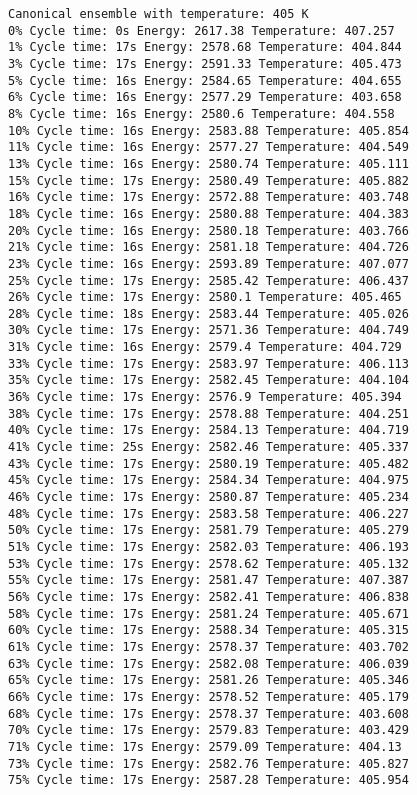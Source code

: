 \documentclass{article}
\begin{document}
\begin{verbatim}
Canonical ensemble with temperature: 405 K
0% Cycle time: 0s Energy: 2617.38 Temperature: 407.257
1% Cycle time: 17s Energy: 2578.68 Temperature: 404.844
3% Cycle time: 17s Energy: 2591.33 Temperature: 405.473
5% Cycle time: 16s Energy: 2584.65 Temperature: 404.655
6% Cycle time: 16s Energy: 2577.29 Temperature: 403.658
8% Cycle time: 16s Energy: 2580.6 Temperature: 404.558
10% Cycle time: 16s Energy: 2583.88 Temperature: 405.854
11% Cycle time: 16s Energy: 2577.27 Temperature: 404.549
13% Cycle time: 16s Energy: 2580.74 Temperature: 405.111
15% Cycle time: 17s Energy: 2580.49 Temperature: 405.882
16% Cycle time: 17s Energy: 2572.88 Temperature: 403.748
18% Cycle time: 16s Energy: 2580.88 Temperature: 404.383
20% Cycle time: 16s Energy: 2580.18 Temperature: 403.766
21% Cycle time: 16s Energy: 2581.18 Temperature: 404.726
23% Cycle time: 16s Energy: 2593.89 Temperature: 407.077
25% Cycle time: 17s Energy: 2585.42 Temperature: 406.437
26% Cycle time: 17s Energy: 2580.1 Temperature: 405.465
28% Cycle time: 18s Energy: 2583.44 Temperature: 405.026
30% Cycle time: 17s Energy: 2571.36 Temperature: 404.749
31% Cycle time: 16s Energy: 2579.4 Temperature: 404.729
33% Cycle time: 17s Energy: 2583.97 Temperature: 406.113
35% Cycle time: 17s Energy: 2582.45 Temperature: 404.104
36% Cycle time: 17s Energy: 2576.9 Temperature: 405.394
38% Cycle time: 17s Energy: 2578.88 Temperature: 404.251
40% Cycle time: 17s Energy: 2584.13 Temperature: 404.719
41% Cycle time: 25s Energy: 2582.46 Temperature: 405.337
43% Cycle time: 17s Energy: 2580.19 Temperature: 405.482
45% Cycle time: 17s Energy: 2584.34 Temperature: 404.975
46% Cycle time: 17s Energy: 2580.87 Temperature: 405.234
48% Cycle time: 17s Energy: 2583.58 Temperature: 406.227
50% Cycle time: 17s Energy: 2581.79 Temperature: 405.279
51% Cycle time: 17s Energy: 2582.03 Temperature: 406.193
53% Cycle time: 17s Energy: 2578.62 Temperature: 405.132
55% Cycle time: 17s Energy: 2581.47 Temperature: 407.387
56% Cycle time: 17s Energy: 2582.41 Temperature: 406.838
58% Cycle time: 17s Energy: 2581.24 Temperature: 405.671
60% Cycle time: 17s Energy: 2588.34 Temperature: 405.315
61% Cycle time: 17s Energy: 2578.37 Temperature: 403.702
63% Cycle time: 17s Energy: 2582.08 Temperature: 406.039
65% Cycle time: 17s Energy: 2581.26 Temperature: 405.346
66% Cycle time: 17s Energy: 2578.52 Temperature: 405.179
68% Cycle time: 17s Energy: 2578.37 Temperature: 403.608
70% Cycle time: 17s Energy: 2579.83 Temperature: 403.429
71% Cycle time: 17s Energy: 2579.09 Temperature: 404.13
73% Cycle time: 17s Energy: 2582.76 Temperature: 405.827
75% Cycle time: 17s Energy: 2587.28 Temperature: 405.954

\end{verbatim}
\end{document}
